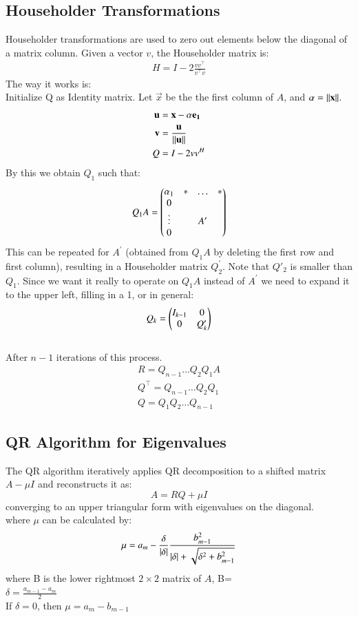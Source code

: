\documentclass[journal,12pt,onecolumn]{IEEEtran}
\theoremstyle{remark}
\begin{document}
\subsection{Householder Transformations}
Householder transformations are used to zero out elements below the diagonal of a matrix column. Given a vector $v$, the Householder matrix is:
\begin{align}
    H = I - 2\frac{vv^\top}{v^\top v}
\end{align}
The way it works is:\\
Initialize Q as Identity matrix. Let $\vec{x}$ be the the first column of $A$, and $\alpha=\left\lVert\mathbf{x}\right\rVert$.\\
\begin{align}
    \mathbf{u}&=\mathbf{x}-\alpha\mathbf{e_1}\\
    \mathbf{v}&=\frac{\mathbf{u}}{\left\lVert\mathbf{u}\right\rVert}\\
    Q&=I-2vv^H
\end{align}
By this we obtain $Q_1$ such that:\\
$$Q_1A=\begin{pmatrix}\alpha_1 & * & \dots & *\\ 0 & & &\\\vdots & & A^\prime &\\0 & & &\end{pmatrix}$$
This can be repeated for $A^\prime$ (obtained from $Q_1A$ by deleting the first row and first column), resulting in a Householder matrix $Q^\prime_2$. Note that $Q\prime_2$ is smaller than $Q_1$. Since we want it really to operate on $Q_1A$ instead of $A^\prime$ we need to expand it to the upper left, filling in a 1, or in general:
$$Q_k=\begin{pmatrix}I_{k-1} & 0 \\ 0 & Q^\prime_k\end{pmatrix}$$\\
After $n-1$ iterations of this process.\\
\begin{align}
R=Q_{n-1}\dots Q_2Q_1A\\
Q^\top=Q_{n-1}\dots Q_2Q_1\\
Q=Q_1Q_2\dots Q_{n-1}
\end{align}
\subsection{QR Algorithm for Eigenvalues}
The QR algorithm iteratively applies QR decomposition to a shifted matrix \( A - \mu I \) and reconstructs it as:
$$A = RQ + \mu I$$
converging to an upper triangular form with eigenvalues on the diagonal.\\
where $\mu$ can be calculated by:\\
$$\mu=a_m-\frac{\delta}{\left\vert\delta\right\vert}\frac{b^2_{m-1}}{\left\vert\delta\right\vert+\sqrt{\delta^2+b^2_{m-1}}}$$
where B is the lower rightmost $2\times 2$ matrix of $A$, B= \\
$\delta=\frac{a_{m-1}-a_m}{2}$\\
If $\delta=0$, then $\mu=a_m-b_{m-1}$
\end{document}
